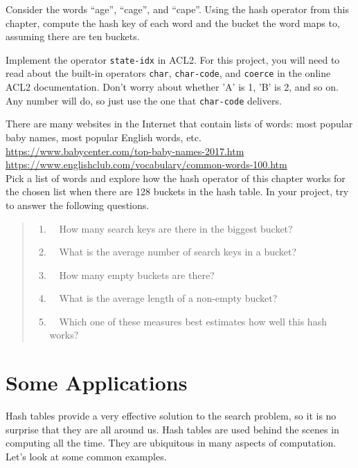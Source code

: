\begin{ExerciseList}
\Exercise Consider the words ``age'', ``cage'', and ``cape''. 
Using the hash operator from this chapter, compute the hash key of each word 
and the bucket the word maps to, assuming there are ten buckets.

\Exercise Implement the operator \texttt{state-idx} in ACL2. For this
project, you will need to read about the built-in operators \texttt{char},
\texttt{char-code}, and \texttt{coerce}
in the online ACL2 documentation. 
Don't worry about whether 'A' is 1,
'B' is 2, and so on. Any number will do, so just use the one that 
\texttt{char-code} delivers.

\Exercise There are many websites in the Internet that contain lists of words: 
most popular baby names, most popular English words, etc.\\
\hspace*{1cm}\url{https://www.babycenter.com/top-baby-names-2017.htm} \\
\hspace*{1cm}\url{https://www.englishclub.com/vocabulary/common-words-100.htm}\\
Pick a list of words and explore how the hash operator of this chapter works 
for the chosen list when there are 128 buckets in the hash table.
In your project, try to answer the following questions.
\begin{quote}
\begin{enumerate}
\item ~~How many search keys are there in the biggest bucket? 
\item ~~What is the average number of search keys in a bucket?
\item ~~How many empty buckets are there?
\item ~~What is the average length of a non-empty bucket? 
\item ~~Which one of these measures best estimates how well this hash works?
\end{enumerate}
\end{quote}
\end{ExerciseList}

\section{Some Applications}

Hash tables provide a very effective solution to the search problem, 
so it is no surprise that they are all around us. 
Hash tables are used behind the scenes in computing all the time.
They are ubiquitous in many aspects of computation. 
Let's look at some common examples.

